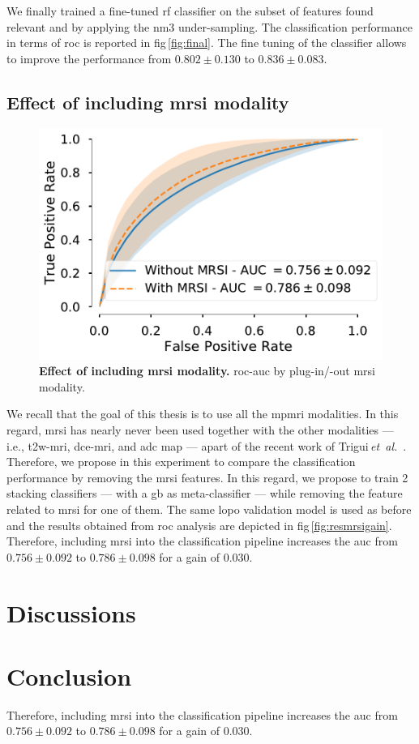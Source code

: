 \documentclass[final,3p,times,twocolumn]{elsarticle}
\begin{document}
We finally trained a fine-tuned \ac{rf} classifier on the subset of features
found relevant and by applying the \ac{nm3} under-sampling. The classification
performance in terms of \ac{roc} is reported in
\acs{fig}\,\ref{fig:final}. The fine tuning of the classifier allows to improve
the performance from $0.802 \pm 0.130$ to $0.836 \pm 0.083$.

\subsection{Effect of including \acs*{mrsi} modality}\label{discussion:mrsi}

\begin{figure}
  \includegraphics[width=.45\textwidth]{images/stacking_wt_mrsi.pdf}
  \caption{\textbf{Effect of including \ac{mrsi} modality.} \ac{roc}-\ac{auc}
    by plug-in/-out \ac{mrsi} modality.}
  \label{fig:stacking_mrsi}
\end{figure}

We recall that the goal of this thesis is to use all the \ac{mpmri} modalities.
In this regard, \ac{mrsi} has nearly never been used together with the other
modalities --- i.e., \ac{t2w}-\ac{mri}, \ac{dce}-\ac{mri}, and \ac{adc} map ---
apart of the recent work of
Trigui\,\emph{et~al.}~\cite{trigui2016classification,trigui2017automatic}.
Therefore, we propose in this experiment to compare the classification
performance by removing the \ac{mrsi} features.  In this regard, we propose to
train 2 stacking classifiers --- with a \ac{gb} as meta-classifier --- while
removing the feature related to \ac{mrsi} for one of them.  The same \ac{lopo}
validation model is used as before and the results obtained from \ac{roc}
analysis are depicted in \acs{fig}\,\ref{fig:resmrsigain}.  Therefore,
including \ac{mrsi} into the classification pipeline increases the \ac{auc}
from $0.756 \pm 0.092$ to $0.786 \pm 0.098$ for a gain of $0.030$.


\section{Discussions}

\section{Conclusion}\label{sec:conclusion}

Therefore, including \ac{mrsi} into the classification pipeline increases the \ac{auc} from $0.756 \pm 0.092$ to $0.786 \pm 0.098$ for a gain of $0.030$.

 

\end{document}
